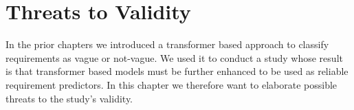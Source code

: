 \chapter{Threats to Validity}
\label{chp:threats_to_validity}
In the prior chapters we introduced a transformer based approach to classify requirements as vague or not-vague.
We used it to conduct a study whose result is that transformer based models must be further enhanced to be used as reliable requirement predictors.
In this chapter we therefore want to elaborate possible threats to the study's validity.






